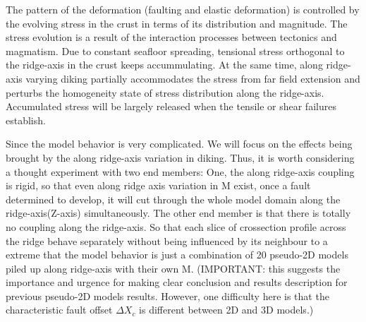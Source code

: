 The pattern of the deformation (faulting and elastic deformation) is controlled by the evolving stress in the crust in terms of its distribution and magnitude. The stress evolution is a result of the interaction processes between tectonics and magmatism. Due to constant seafloor spreading, tensional stress orthogonal to the ridge-axis in the crust keeps accummulating. At the same time, along ridge-axis varying diking partially accommodates the stress from far field extension and perturbs the homogeneity state of stress distribution along the ridge-axis. Accumulated stress will be largely released when the tensile or shear failures establish.

Since the model behavior is very complicated. We will focus on the effects being brought by the along ridge-axis variation in diking. Thus, it is worth considering a thought experiment with two end members: One, the along ridge-axis coupling is rigid, so that even along ridge axis variation in M exist, once a fault determined to develop, it will cut through the whole model domain along the ridge-axis(Z-axis) simultaneously. The other end member is that there is totally no coupling along the ridge-axis. So that each slice of crossection profile across the ridge behave separately without being influenced by its neighbour to a extreme that the model behavior is just a combination of 20 pseudo-2D models piled up along ridge-axis with their own M. (IMPORTANT: this suggests the importance and urgence for making clear conclusion and results description for previous pseudo-2D models results. However, one difficulty here is that the characteristic fault offset $\Delta X_{c}$ is different between 2D and 3D models.)
\fi
